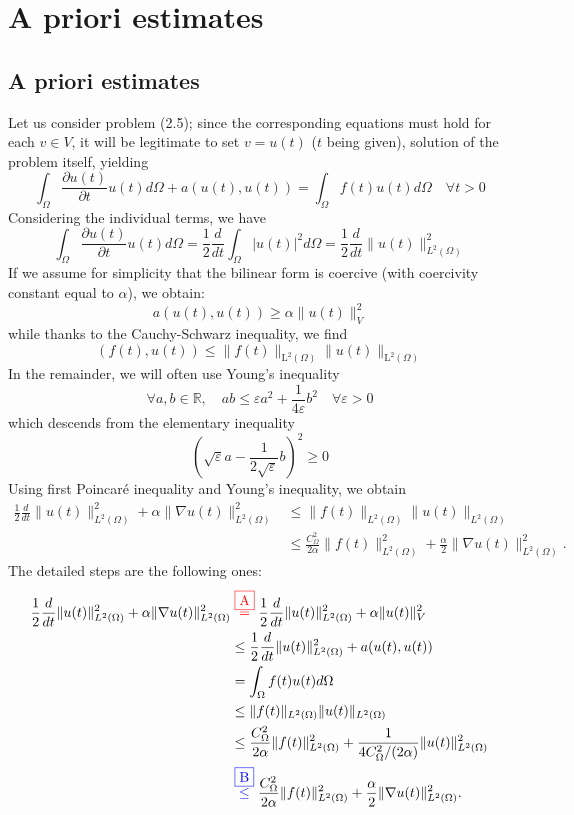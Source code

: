 \documentclass[11pt]{book}
\begin{document}
\section{A priori estimates}
\subsection*{A priori estimates}
Let us consider problem (2.5); since the corresponding equations must hold for each $v \in V$, it will be legitimate to set $v=u(t)$ ($t$ being given), solution of the problem itself, yielding
\begin{equation}
    \int_{\Omega} \frac{\partial u(t)}{\partial t} u(t) d \Omega+a(u(t), u(t))=\int_{\Omega} f(t) u(t) d \Omega \quad \forall t>0
\end{equation}
Considering the individual terms, we have
\begin{equation}
\int_{\Omega} \frac{\partial u(t)}{\partial t} u(t) d \Omega=\frac{1}{2} \frac{d}{ dt} \int_{\Omega}|u(t)|^{2} d \Omega=\frac{1}{2} \frac{d}{d t}\|u(t)\|_{L^{2}(\Omega)}^{2}
\end{equation}
If we assume for simplicity that the bilinear form is coercive (with coercivity constant equal to $\alpha$), we obtain:
$$
a(u(t), u(t)) \geq \alpha\|u(t)\|_{V}^{2}
$$
while thanks to the Cauchy-Schwarz inequality, we find
\begin{equation}
    (f(t), u(t)) \leq\|f(t)\|_{\mathrm{L}^{2}(\Omega)}\|u(t)\|_{\mathrm{L}^{2}(\Omega)}
\end{equation}
In the remainder, we will often use Young's inequality
$$
\forall a, b \in \mathbb{R}, \quad a b \leq \varepsilon a^{2}+\frac{1}{4 \varepsilon} b^{2} \quad \forall \varepsilon>0
$$
which descends from the elementary inequality
$$
\left(\sqrt{\varepsilon} a-\frac{1}{2 \sqrt{\varepsilon}} b\right)^{2} \geq 0
$$
Using first Poincaré inequality and Young's inequality, we obtain
\begin{align}
\frac{1}{2} \frac{d}{d t}\|u(t)\|_{L^{2}(\Omega)}^{2} + \alpha\|\nabla u(t)\|_{L^{2}(\Omega)}^{2} &\leq \|f(t)\|_{L^{2}(\Omega)}\|u(t)\|_{L^{2}(\Omega)} \\
&\leq \frac{C_{\Omega}^{2}}{2 \alpha}\|f(t)\|_{L^{2}(\Omega)}^{2} + \frac{\alpha}{2}\|\nabla u(t)\|_{L^{2}(\Omega)}^{2}. \nonumber
\end{align}
The detailed steps are the following ones:
$$
\begin{aligned}
\frac{1}{2} \frac{d}{d t}\|u(t)\|_{L^2(\Omega)}^2+\alpha\|\nabla u(t)\|_{L^2(\Omega)}^2 
& \overset{\color{red}{\fbox{A}} }=\frac{1}{2} \frac{d}{d t}\|u(t)\|_{L^2(\Omega)}^2+\alpha\|u(t)\|_{V}^2\\ 
& \le \frac{1}{2} \frac{d}{d t}\|u(t)\|_{L^2(\Omega)}^2+a(u(t),u(t))\\
& = \int_{\Omega} f(t) u(t) d\Omega \\
&\leq\|f(t)\|_{L^2(\Omega)}\|u(t)\|_{L^2(\Omega)} \\
&\leq \frac{C_\Omega^2}{2\alpha}\|f(t)\|_{L^2(\Omega)}^2 + \frac1{4C_\Omega^2/(2\alpha)}\|u(t)\|_{L^2(\Omega)}^2 \\
& \overset{\color{blue}{\fbox{B}} }\leq \frac{C_{\Omega}^2}{2 \alpha}\|f(t)\|_{L^2(\Omega)}^2+\frac{\alpha}{2}\|\nabla u(t)\|_{L^2(\Omega)}^2 .
\end{aligned} 
$$
\end{document}
